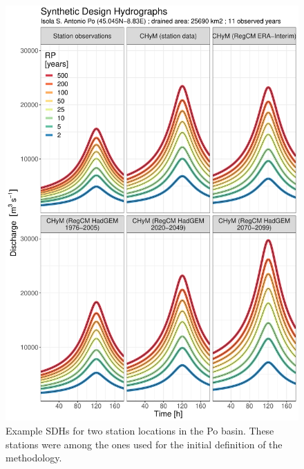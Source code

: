 \begin{figure}
        \includegraphics[width=0.45\textheight]{figures/valid_Q/SDH/id12_SDH_reg1_22}
    \decoRule
    \caption[Example SDHs (1)]{
        Example SDHs for two station locations in the Po basin. These stations were among the ones used for the initial definition of the methodology.
    }\label{fig:example_sdhs_1}
\end{figure}
\afterpage{\clearpage}
